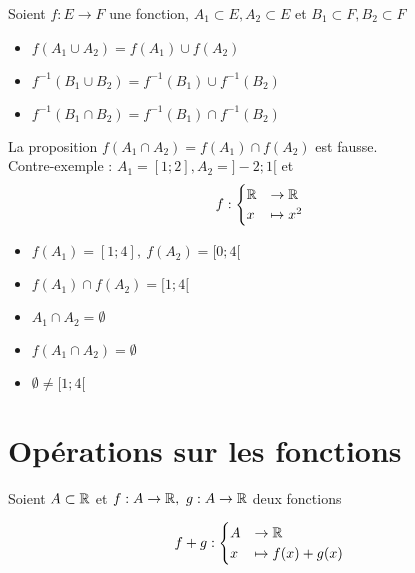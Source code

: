 \clearpage

\begin{graybox}
	\begin{proposition}
		Soient $f:E \to F$ une fonction, $A_1 \subset E, A_2 \subset E$ et $B_1 \subset F, B_2 \subset F$
		\begin{itemize}
			\item $f(A_1 \cup A_2) = f(A_1) \cup f(A_2)$
			\item $f^{-1}(B_1 \cup B_2) = f^{-1}(B_1) \cup f^{-1}(B_2)$
			\item $f^{-1}(B_1 \cap B_2) = f^{-1}(B_1) \cap f^{-1}(B_2)$
		\end{itemize}
	\end{proposition}
\end{graybox}

\begin{remarque}
	La proposition $f(A_1 \cap A_2) = f(A_1) \cap f(A_2)$ est fausse.
	\\
	Contre-exemple : $A_1 = [1;2], A_2 = ]-2; 1[$ et 
	\begin{align*}
		f :
		\begin{cases}
			\mathbb{R} &\to \mathbb{R} \\
			x &\mapsto x^2
		\end{cases}
	\end{align*}
	\begin{itemize}
		\item $f(A_1) = [1;4],\ f(A_2) = [0;4[$
		\item $f(A_1) \cap f(A_2) = [1;4[$
		\item $A_1 \cap A_2 = \emptyset$
		\item $f(A_1 \cap A_2) = \emptyset$
		\item $\emptyset \neq [1;4[$
	\end{itemize}    
\end{remarque}


\section{Opérations sur les fonctions}
\noindent Soient $A \subset \mathbb{R}$ et $f:A \to \mathbb{R},\ g:A\to \mathbb{R}$ deux fonctions

\begin{graybox}
	\begin{proposition}
		\begin{align*}
			f + g : 
			\begin{cases}
				A &\to \mathbb{R} \\
				x &\mapsto f(x) + g(x)
			\end{cases}
		\end{align*}
	\end{proposition}
\end{graybox}

